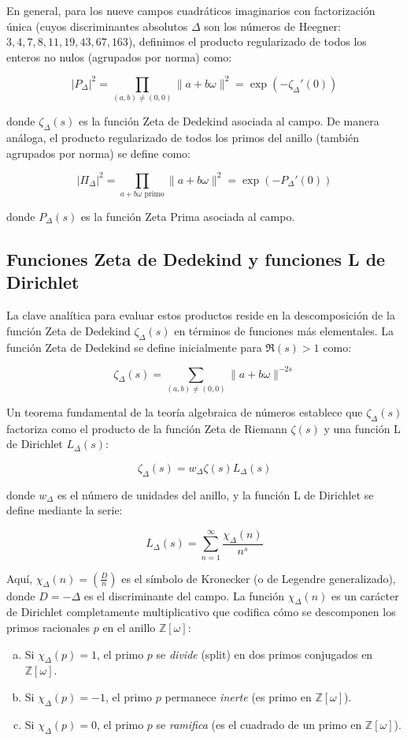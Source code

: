 En general, para los nueve campos cuadráticos imaginarios con factorización única (cuyos discriminantes absolutos $\Delta$ son los números de Heegner: $3, 4, 7, 8, 11, 19, 43, 67, 163$), definimos el producto regularizado de todos los enteros no nulos (agrupados por norma) como:

$$ |P_\Delta|^2 = \prod_{(a,b) \neq (0,0)} \|a+b\omega\|^2 = \exp(-\zeta_\Delta'(0)) $$

donde $\zeta_\Delta(s)$ es la función Zeta de Dedekind asociada al campo. De manera análoga, el producto regularizado de todos los primos del anillo (también agrupados por norma) se define como:

$$ |\Pi_\Delta|^2 = \prod_{a+b\omega \text{ primo}} \|a+b\omega\|^2 = \exp(-P_\Delta'(0)) $$

donde $P_\Delta(s)$ es la función Zeta Prima asociada al campo.

\subsection{Funciones Zeta de Dedekind y funciones L de Dirichlet}

La clave analítica para evaluar estos productos reside en la descomposición de la función Zeta de Dedekind $\zeta_\Delta(s)$ en términos de funciones más elementales. La función Zeta de Dedekind se define inicialmente para $\Re(s) > 1$ como:

$$ \zeta_\Delta(s) = \sum_{(a,b) \neq (0,0)} \|a+b\omega\|^{-2s} $$

Un teorema fundamental de la teoría algebraica de números establece que $\zeta_\Delta(s)$ factoriza como el producto de la función Zeta de Riemann $\zeta(s)$ y una función L de Dirichlet $L_\Delta(s)$:

$$ \zeta_\Delta(s) = w_\Delta \zeta(s) L_\Delta(s) $$

donde $w_\Delta$ es el número de unidades del anillo, y la función L de Dirichlet se define mediante la serie:

$$ L_\Delta(s) = \sum_{n=1}^{\infty} \frac{\chi_\Delta(n)}{n^s} $$

Aquí, $\chi_\Delta(n) = \left(\frac{D}{n}\right)$ es el símbolo de Kronecker (o de Legendre generalizado), donde $D = -\Delta$ es el discriminante del campo. La función $\chi_\Delta(n)$ es un carácter de Dirichlet completamente multiplicativo que codifica cómo se descomponen los primos racionales $p$ en el anillo $\mathbb{Z}[\omega]$:
\begin{enumerate}[a)]
    \item Si $\chi_\Delta(p) = 1$, el primo $p$ se \textit{divide} (split) en dos primos conjugados en $\mathbb{Z}[\omega]$.
    \item Si $\chi_\Delta(p) = -1$, el primo $p$ permanece \textit{inerte} (es primo en $\mathbb{Z}[\omega]$).
    \item Si $\chi_\Delta(p) = 0$, el primo $p$ se \textit{ramifica} (es el cuadrado de un primo en $\mathbb{Z}[\omega]$).
\end{enumerate}

